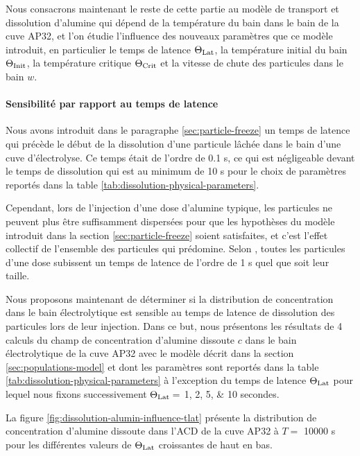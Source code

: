 Nous consacrons maintenant le reste de cette partie au
modèle de transport et dissolution d'alumine qui dépend de la
température du bain dans le bain de la cuve AP32, et l'on étudie
l'influence des nouveaux paramètres que ce modèle introduit,
en particulier le temps de latence $\Theta_\text{Lat}$, la température initial du
bain $\Theta_\text{Init}$, la température critique $\Theta_\text{Crit}$ et la vitesse de
chute des particules dans le bain $w$.


\paragraph{Sensibilité par rapport au temps de latence}
Nous avons introduit dans le paragraphe \ref{sec:particle-freeze} un
temps de latence qui précède le début de la dissolution d'une
particule lâchée dans le bain d'une cuve d'électrolyse. Ce temps était de l'ordre de \num{0.1} \si{\second}, ce qui est
négligeable devant le temps de dissolution qui est au minimum de
\num{10} \si{\second} pour le choix de paramètres reportés dans la
table \ref{tab:dissolution-physical-parameters}.

Cependant, lors de l'injection d'une dose d'alumine typique, les
particules ne peuvent plus être suffisamment dispersées pour que
les hypothèses du modèle introduit dans la section
\ref{sec:particle-freeze} soient satisfaites, et c'est l'effet
collectif de l'ensemble des particules qui prédomine. Selon
\cite{Dassylva2015}, toutes les particules d'une dose subissent un
temps de latence de l'ordre de \num{1} \si{\second} quel que soit leur
taille.

Nous proposons maintenant de déterminer si la distribution de
concentration dans le bain électrolytique est sensible au temps de
latence de dissolution des particules lors de leur injection. Dans ce
but, nous présentons les résultats de 4 calculs du champ de
concentration d'alumine dissoute $c$ dans le bain électrolytique de la
cuve AP32 avec le modèle décrit dans la section
\ref{sec:populations-model} et dont les paramètres sont reportés dans
la table \ref{tab:dissolution-physical-parameters} à l'exception du
temps de latence $\Theta_\text{Lat}$ pour lequel nous fixons successivement $\Theta_\text{Lat}
= $ \numlist{1;2;5;10} secondes.



La figure \ref{fig:dissolution-alumin-influence-tlat} présente la
distribution de concentration d'alumine dissoute dans l'ACD de la cuve
AP32 à $T = $ \num{10000} \si{\second} pour les différentes valeurs
de $\Theta_\text{Lat}$ croissantes de haut en bas.

